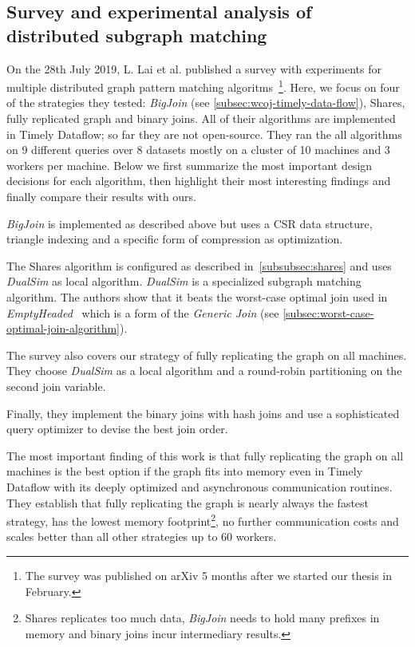 
\subsection{Survey and experimental analysis of distributed subgraph matching}
On the 28th July 2019, L. Lai et al. published a survey with experiments for multiple
distributed graph pattern matching algoritms~\cite{longbin}\footnote{The survey was published on arXiv 5 months after we started our
thesis in
February.}.
Here, we focus on four of the strategies they tested: \textit{BigJoin} (see \cref{subsec:wcoj-timely-data-flow}),
Shares, fully replicated graph and binary joins.
All of their algorithms are implemented in Timely Dataflow;
so far they are not open-source.
They ran the all algorithms on 9 different queries over 8 datasets mostly on a cluster of 10 machines
and 3 workers per machine.
Below we first summarize the most important design decisions for each algorithm, then
highlight their most interesting findings and finally compare their results with ours.

\textit{BigJoin} is implemented as described above but uses a \textsc{CSR} data structure,
triangle indexing and a specific form of compression as optimization.

The Shares algorithm is configured as described in~\cref{subsubsec:shares} and uses
\textit{DualSim} as local algorithm.
\textit{DualSim} is a specialized subgraph matching algorithm.
The authors show that it beats the worst-case optimal join used in \textit{EmptyHeaded}~\cite{emptyheaded}
which is a form of the \textit{Generic Join} (see \cref{subsec:worst-case-optimal-join-algorithm}).

The survey also covers our strategy of fully replicating the graph on all machines.
They choose \textit{DualSim} as a local algorithm and a round-robin partitioning on the
second join variable.

Finally, they implement the binary joins with hash joins and use a sophisticated query optimizer
to devise the best join order.

The most important finding of this work is that fully replicating the graph on all machines
is the best option if the graph fits into memory even in Timely Dataflow with its deeply
optimized and asynchronous communication routines.
They establish that fully replicating the graph is nearly always the fastest strategy,
has the lowest memory footprint\footnote{Shares replicates too much data,
\textit{BigJoin} needs to hold many prefixes in memory and binary joins incur intermediary results.}, no
further
communication costs and scales better
than
all other strategies up to 60 workers.

